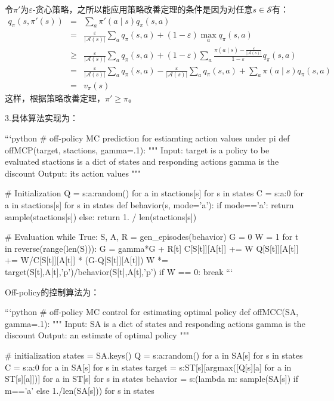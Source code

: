 \documentclass{ctexart}
\begin{document}
令$\pi'$为$\varepsilon$-贪心策略，之所以能应用策略改善定理的条件是因为对任意$s\in\mathcal S$有：
\begin{align*}
q_\pi(s,\pi'(s))
&=& \sum_a\pi'(a\mid s)q_\pi(s,a)\\
&=& \frac{\varepsilon}{\left\vert \mathcal A(s) \right\vert}\sum_aq_\pi(s,a) + (1-\varepsilon)\max_aq_\pi(s,a)\\
&\ge& \frac{\varepsilon}{\left\vert \mathcal A(s) \right\vert}\sum_aq_\pi(s,a) + (1-\varepsilon)\sum_a \frac{\pi(a\mid s)-\frac{\varepsilon}{\left\vert \mathcal A(s) \right\vert}}{1-\varepsilon}q_\pi(s,a)\\
&=& \frac{\varepsilon}{\left\vert \mathcal A(s) \right\vert}\sum_aq_\pi(s,a) - \frac{\varepsilon}{\left\vert \mathcal A(s) \right\vert}\sum_aq_\pi(s,a) + \sum_a\pi(a\mid s)q_\pi(s,a)\\
&=& v_\pi(s)
\end{align*}
这样，根据策略改善定理，$\pi' \ge \pi$。



3.具体算法实现为：

```python
# off-policy MC prediction for estiamting action values under pi
def offMCP(target, stactions, gamma=.1):
    """
    Input: target is a policy to be evaluated
           stactions is a dict of states and responding actions
           gamma is the discount
    Output: its action values
    """
    
    # Initialization
    Q = {s:{a:random() for a in stactions[s]} for s in states}
    C = {s:{a:0 for a in stactions[s]} for s in states}
    def behavior(s, mode='a'):
        if mode=='a':
        	return sample(stactions[s])
        else:
            return 1. / len(stactions[s])
    
    # Evaluation
    while True:
        S, A, R = gen_episodes(behavior)
        G = 0
        W = 1
        for t in reverse(range(len(S))):
            G = gamma*G + R[t]
            C[S[t]][A[t]] += W
            Q[S[t]][A[t]] += W/C[S[t]][A[t]] * (G-Q[S[t]][A[t]])
            W *= target(S[t],A[t],'p')/behavior(S[t],A[t],'p')
            if W == 0:
                break
```

Off-policy的控制算法为：

```python
# off-policy MC control for estimating optimal policy
def offMCC(SA, gamma=.1):
    """
    Input: SA is a dict of states and responding actions
           gamma is the discount
    Output: an estimate of optimal policy
    """
    
    # initialization
    states = SA.keys()
    Q = {s:{a:random() for a in SA[s]} for s in states}
    C = {s:{a:0 for a in SA[s]} for s in states}
    target = {s:ST[s][argmax([Q[s][a]
    		  for a in ST[s][a]])] for a in ST[s] for s in states}
    behavior = {s:(lambda m:
                sample(SA[s]) if m=='a' else 1./len(SA[s])) for s in states}
    
\end{document}
